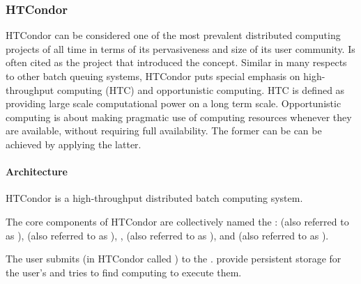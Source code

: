 \documentclass{sig-alternate}
\begin{document}
%
%
\subsubsection{HTCondor}
\label{sec:htcondor}

HTCondor can be considered one of the most prevalent distributed computing
projects of all time in terms of its pervasiveness and size of its user
community. Is often cited as the project that introduced the \pilot
concept\cite{}. Similar in many respects to other batch queuing systems,
HTCondor puts special emphasis on high-throughput computing (HTC) and
opportunistic computing. HTC is defined as providing large scale computational
power on a long term scale. Opportunistic computing is about making pragmatic
use of computing resources whenever they are available, without requiring full
availability. The former can be can be achieved by applying the latter.




\paragraph{Architecture}

HTCondor is a high-throughput distributed batch computing system.

%
%
The core components of HTCondor are collectively named the :  (also referred to as
),  (also referred to as ),
,  (also referred to as ),
and  (also referred to as ).

The user submits  (in HTCondor called ) to the
.  provide persistent storage for the user's
 and tries to find computing  
to execute them.
\end{document}
